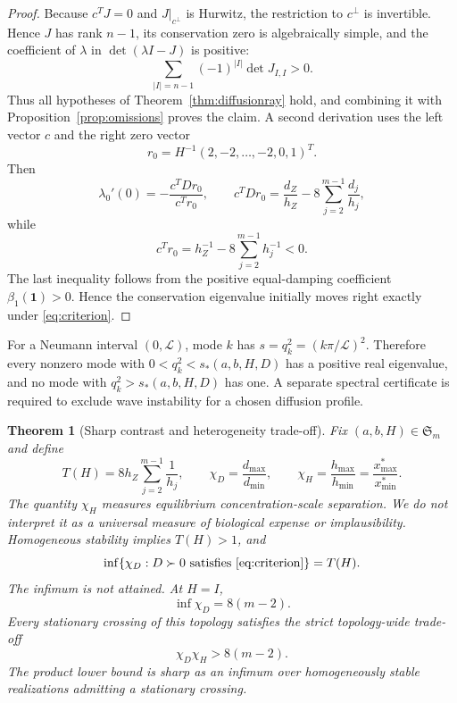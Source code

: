 \documentclass[11pt]{article}
\newtheorem{theorem}{Theorem}[section]
\theoremstyle{definition}
\newcommand{\1}{\mathbf 1}
\begin{document}
\begin{proof}
Because $c^TJ=0$ and $J|_{c^\perp}$ is Hurwitz, the restriction to
$c^\perp$ is invertible.  Hence $J$ has rank $n-1$, its conservation zero is
algebraically simple, and the coefficient of $\lambda$ in
$\det(\lambda I-J)$ is positive:
\[
 \sum_{|I|=n-1}(-1)^{|I|}\det J_{I,I}>0.
\]
Thus all hypotheses of Theorem~\ref{thm:diffusionray} hold, and combining it
with Proposition~\ref{prop:omissions} proves the claim.  A second derivation
uses the left vector $c$ and the right zero vector
\[
 r_0=H^{-1}(2,-2,\ldots,-2,0,1)^T.
\]
Then
\[
 \lambda_0'(0)=-\frac{c^TDr_0}{c^Tr_0},\qquad
 c^TDr_0=\frac{d_Z}{h_Z}-8\sum_{j=2}^{m-1}\frac{d_j}{h_j},
\]
while
\[
 c^Tr_0=h_Z^{-1}-8\sum_{j=2}^{m-1}h_j^{-1}<0.
\]
The last inequality follows
from the positive equal-damping coefficient $\beta_1(\1)>0$.  Hence the
conservation eigenvalue initially moves right exactly under
\eqref{eq:criterion}.
\end{proof}

For a Neumann interval $(0,\mathcal L)$, mode $k$ has
$s=q_k^2=(k\pi/\mathcal L)^2$.
Therefore every nonzero mode with
$0<q_k^2<s_*(a,b,H,D)$ has a positive real eigenvalue, and no mode with
$q_k^2>s_*(a,b,H,D)$ has one.  A separate spectral certificate is required to
exclude wave instability for a chosen diffusion profile.

\begin{theorem}[Sharp contrast and heterogeneity trade-off]\label{thm:contrast}
Fix $(a,b,H)\in\mathfrak S_m$ and define
\begin{equation}\label{eq:TH}
 T(H)=8h_Z\sum_{j=2}^{m-1}\frac1{h_j},\qquad
 \chi_D=\frac{d_{\max}}{d_{\min}},\qquad
 \chi_H=\frac{h_{\max}}{h_{\min}}=
 \frac{x^*_{\max}}{x^*_{\min}}.
\end{equation}
The quantity $\chi_H$ measures equilibrium concentration-scale separation.
We do not interpret it as a universal measure of biological expense or
implausibility.
Homogeneous stability implies $T(H)>1$, and
\begin{equation}\label{eq:fixedHinf}
 \inf\{\chi_D:D\succ0\text{ satisfies \eqref{eq:criterion}}\}=T(H).
\end{equation}
The infimum is not attained.  At $H=I$,
\begin{equation}\label{eq:unitinf}
 \inf\chi_D=8(m-2).
\end{equation}
Every stationary crossing of this topology satisfies the strict topology-wide
trade-off
\begin{equation}\label{eq:productlower}
 \boxed{\quad \chi_D\chi_H>8(m-2).\quad}
\end{equation}
The product lower bound is sharp as an infimum over homogeneously stable
realizations admitting a stationary crossing.
\end{theorem}
\end{document}
